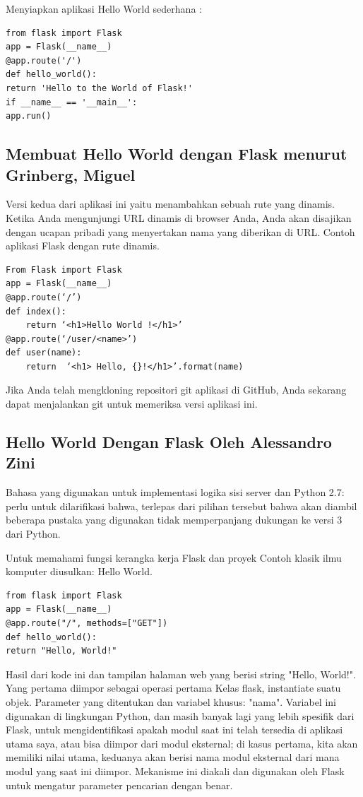 Menyiapkan aplikasi Hello World sederhana :
\begin{verbatim}
from flask import Flask
app = Flask(__name__)
@app.route('/')
def hello_world():
return 'Hello to the World of Flask!'
if __name__ == '__main__':
app.run()
\end{verbatim}

\subsection{Membuat Hello World dengan Flask menurut Grinberg, Miguel}
Versi kedua dari aplikasi ini yaitu menambahkan sebuah rute yang dinamis. Ketika Anda mengunjungi URL dinamis di browser Anda, Anda akan disajikan dengan ucapan pribadi yang menyertakan nama yang diberikan di URL. Contoh aplikasi Flask dengan rute dinamis.
\begin{verbatim}
From Flask import Flask
app = Flask(__name__)
@app.route(‘/’)
def index():
	return ‘<h1>Hello World !</h1>’
@app.route(‘/user/<name>’)
def user(name):
	return  ‘<h1> Hello, {}!</h1>’.format(name)

\end{verbatim}
Jika Anda telah mengkloning repositori git aplikasi di GitHub, Anda sekarang dapat menjalankan git untuk memeriksa versi aplikasi ini\cite{grinberg2018flask}.

\subsection{Hello World Dengan Flask Oleh Alessandro Zini}

Bahasa yang digunakan untuk implementasi logika sisi server dan Python 2.7: perlu untuk dilarifikasi bahwa, terlepas dari pilihan tersebut bahwa akan diambil beberapa pustaka yang digunakan tidak memperpanjang dukungan ke versi 3 dari Python.

Untuk memahami fungsi kerangka kerja Flask dan proyek Contoh klasik ilmu komputer diusulkan: Hello World.

\begin{verbatim}
from flask import Flask
app = Flask(__name__)
@app.route("/", methods=["GET"])
def hello_world():
return "Hello, World!"
\end{verbatim}

Hasil dari kode ini dan tampilan halaman web yang berisi string "Hello, World!". Yang pertama diimpor sebagai operasi pertama Kelas flask, instantiate suatu objek. Parameter yang ditentukan dan variabel khusus: "nama".  Variabel ini digunakan di lingkungan Python, dan masih banyak lagi yang lebih spesifik dari Flask, untuk mengidentifikasi apakah modul saat ini telah tersedia di aplikasi utama saya, atau bisa diimpor dari modul eksternal; di kasus pertama, kita akan memiliki nilai utama, keduanya akan berisi nama modul eksternal dari mana modul yang saat ini diimpor. Mekanisme ini diakali dan digunakan oleh Flask untuk mengatur parameter pencarian dengan benar\cite{ziniqr}.

